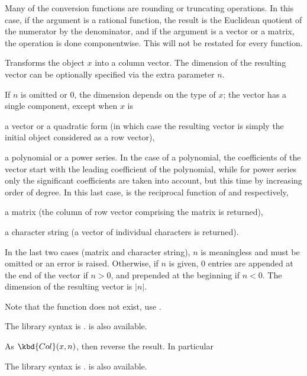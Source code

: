 \noindent
Many of the conversion functions are rounding or truncating operations. In
this case, if the argument is a rational function, the result is the
Euclidean quotient of the numerator by the denominator, and if the argument
is a vector or a matrix, the operation is done componentwise. This will not
be restated for every function.


\label{se:Col}
Transforms the object $x$ into a column vector. The dimension of the
resulting vector can be optionally specified via the extra parameter $n$.

If $n$ is omitted or $0$, the dimension depends on the type of $x$; the
vector has a single component, except when $x$ is

\item a vector or a quadratic form (in which case the resulting vector
is simply the initial object considered as a row vector),

\item a polynomial or a power series. In the case of a polynomial, the
coefficients of the vector start with the leading coefficient of the
polynomial, while for power series only the significant coefficients are
taken into account, but this time by increasing order of degree.
In this last case,  is the reciprocal function of  and
 respectively,

\item a matrix (the column of row vector comprising the matrix is returned),

\item a character string (a vector of individual characters is returned).

In the last two cases (matrix and character string), $n$ is meaningless and
must be omitted or an error is raised. Otherwise, if $n$ is given, $0$
entries are appended at the end of the vector if $n > 0$, and prepended at
the beginning if $n < 0$. The dimension of the resulting vector is $|n|$.

Note that the function  does not exist, use .

The library syntax is .
 is also available.

\label{se:Colrev}
As $\kbd{Col}(x, n)$, then reverse the result. In particular

The library syntax is .
 is also available.

